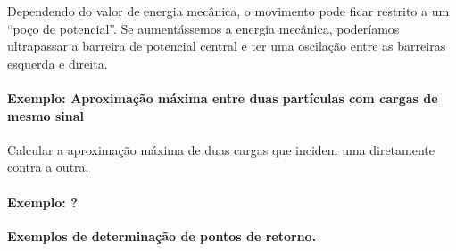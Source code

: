 \begin{marginfigure}
\centering
{}
\caption{Dependendo do valor de energia mecânica, o movimento pode ficar restrito a um ``poço de potencial''. Se aumentássemos a energia mecânica, poderíamos ultrapassar a barreira de potencial central e ter uma oscilação entre as barreiras esquerda e direita. \label{Fig:PocoMoleculaAmonia}}
\end{marginfigure}

\paragraph{Exemplo: Aproximação máxima entre duas partículas com cargas de mesmo sinal}

Calcular a aproximação máxima de duas cargas que incidem uma diretamente contra a outra.

\paragraph{Exemplo: ?}

\textbf{Exemplos de determinação de pontos de retorno.}


